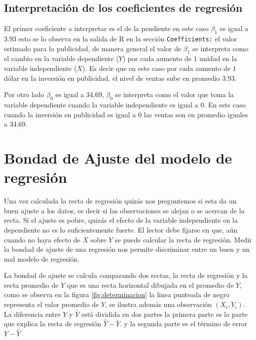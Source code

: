 \documentclass[]{book}
\begin{document}
\hypertarget{coefregre}{%
\subsection{Interpretación de los coeficientes de regresión}\label{coefregre}}

El primer coeficiente a interpretar es el de la pendiente en este caso \(\beta_1\) es igual a 3.93 esto se lo observa en la salida de R en la sección \texttt{Coefficients:} el valor estimado para la publicidad, de manera general el valor de \(\beta_1\) se interpreta como el cambio en la variable dependiente (\(Y\)) por cada aumento de \(1\) unidad en la variable independiente (\(X\)). Es decir que en este caso por cada aumento de \(1\) dólar en la inversión en publicidad, el nivel de ventas sube en promedio 3.93.

Por otro lado \(\beta_0\) es igual a 34.69, \(\beta_0\) se interpreta como el valor que toma la variable dependiente cuando la variable independiente es igual a \(0\). En este caso cuando la inversión en publicidad es igual a \(0\) las ventas son en promedio iguales a 34.69.

\hypertarget{bondad-de-ajuste-del-modelo-de-regresion}{%
\section{Bondad de Ajuste del modelo de regresión}\label{bondad-de-ajuste-del-modelo-de-regresion}}

Una vez calculada la recta de regresión quizás nos preguntemos si esta da un buen ajuste a los datos, es decir si las observaciones se alejan o se acercan de la recta. Si el ajuste es pobre, quizás el efecto de la variable independiente en la dependiente no es lo suficientemente fuerte. El lector debe fijarse en que, aún cuando no haya efecto de \(X\) sobre \(Y\) se puede calcular la recta de regresión. Medir la bondad de ajuste de una regresión nos permite discriminar entre un buen y un mal modelo de regresión.

La bondad de ajuste se calcula comparando dos rectas, la recta de regresión y la recta promedio de \(Y\) que es una recta horizontal dibujada en el promedio de \(Y\), como se observa en la figura \ref{fig:determinacion} la linea punteada de negro representa el valor promedio de \(Y\), se ilustra además una observación \(\left(X_i,Y_i\right)\). La diferencia entre \(Y\) y \(\bar{Y}\) está dividida en dos partes la primera parte es la parte que explica la recta de regresión \(\hat{Y}-\bar{Y}\). y la segunda parte es el término de error \(Y-\hat{Y}\)
\end{document}
